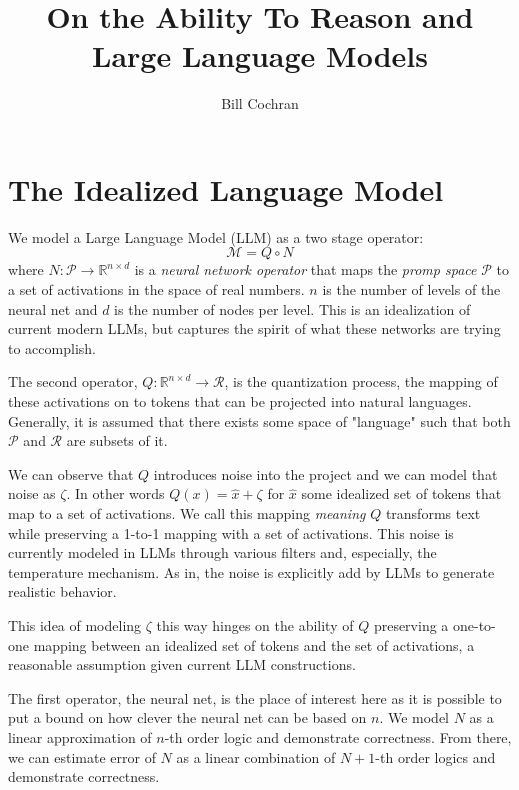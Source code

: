 \documentclass[12pt]{article}
\begin{document}
\title{On the Ability To Reason and Large Language Models}
\author{Bill Cochran}
\maketitle

\section{The Idealized Language Model}

We model a Large Language Model (LLM) as a two stage operator:
$$
\mathcal{M} = Q \circ N
$$
where $N: \mathcal{P}\rightarrow\mathbb{R}^{n\times d}$ is a \emph{neural 
network operator} that maps the \emph{promp space} $\mathcal{P}$ to
a set of activations in the space of real numbers.  $n$ is the
number of levels of the neural net and $d$ is the number of nodes
per level.  This is an idealization of current modern LLMs, but
captures the spirit of what these networks are trying to accomplish.

The second operator, $Q: \mathbb{R}^{n\times d}\rightarrow \mathcal {R}$, 
is the quantization process, the mapping of these activations on to tokens 
that can be projected into natural languages. Generally, it is assumed that
there exists some space of "language" such that both $\mathcal{P}$ and $\mathcal{R}$
are subsets of it.

We can observe that $Q$ introduces noise into the project and we can model
that noise as $\zeta$.  In other words $Q(x) = \hat{x} + \zeta$ for $\hat{x}$
some idealized set of tokens that map to a set of activations. We call this
mapping \emph{meaning}  $Q$ transforms text while preserving a 1-to-1 
mapping with a set of activations.  This noise is currently modeled in LLMs
through various filters and, especially, the temperature mechanism.  As in,
the noise is explicitly add by LLMs to generate realistic behavior.

This idea of modeling $\zeta$ this way hinges on the ability of $Q$ preserving
a one-to-one mapping between an idealized set of tokens and the set of
activations, a reasonable assumption given current LLM constructions.

The first operator, the neural net, is the place of interest here as it is
possible to put a bound on how clever the neural net can be based on $n$.
We model $N$ as a linear approximation of $n$-th order logic and demonstrate
correctness.  From there, we can estimate error of $N$ as a linear combination
of $N+1$-th order logics and demonstrate correctness.
\end{document}

